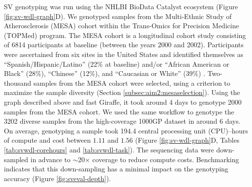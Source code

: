 \documentclass[11pt]{ucscthesis}
\begin{document}
SV genotyping was run using the NHLBI BioData Catalyst ecosystem \cite{bdc2020} (Figure \ref{fig:sv-wdl-graph}D).
We genotyped samples from the Multi-Ethnic Study of Atherosclerosis (MESA) cohort within the Trans-Omics for Precision Medicine (TOPMed) program.
The MESA cohort is a longitudinal cohort study consisting of 6814 participants at baseline (between the years 2000 and 2002).
Participants were ascertained from six sites in the United States and identified themselves as “Spanish/Hispanic/Latino” (22$\%$ at baseline) and/or “African American or Black” (28$\%$), “Chinese” (12$\%$), and “Caucasian or White” (39$\%$) \cite{mesa_2008}. Two-thousand samples from the MESA cohort \cite{mesa_2008} were selected, using a criterion to maximize the sample diversity (Section \ref{subsec:aim2:mesaselection}).
Using the graph described above and fast Giraffe, it took around 4 days to genotype 2000 samples from the MESA cohort.
We used the same workflow to genotype the 3202 diverse samples from the high-coverage 1000GP dataset \cite{1000gp_nygc_2021} in around 6 days.
On average, genotyping a sample took 194.4 central processing unit (CPU)–hours of compute and cost between $1.11$ and $1.56$ (Figure \ref{fig:sv-wdl-graph}D, Tables \ref{tab:svwdl-corehours} and \ref{tab:svwdl-task}).
The sequencing data were down-sampled in advance to $\sim$20× coverage to reduce compute costs.
Benchmarking indicates that this down-sampling has a minimal impact on the genotyping accuracy (Figure \ref{fig:sveval-depth}).
\end{document}
